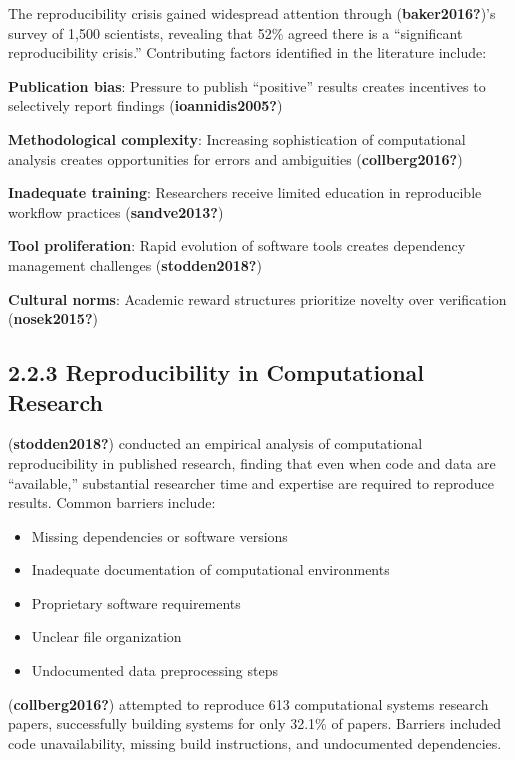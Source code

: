 \documentclass[
  oneside,
  open=any]{scrbook}
\providecommand{\tightlist}{%
  \setlength{\itemsep}{0pt}\setlength{\parskip}{0pt}}\usepackage{longtable,booktabs,array}
\begin{document}
The reproducibility crisis gained widespread attention through
(\textbf{baker2016?})'s survey of 1,500 scientists, revealing that 52\%
agreed there is a ``significant reproducibility crisis.'' Contributing
factors identified in the literature include:

\textbf{Publication bias}: Pressure to publish ``positive'' results
creates incentives to selectively report findings
(\textbf{ioannidis2005?})

\textbf{Methodological complexity}: Increasing sophistication of
computational analysis creates opportunities for errors and ambiguities
(\textbf{collberg2016?})

\textbf{Inadequate training}: Researchers receive limited education in
reproducible workflow practices (\textbf{sandve2013?})

\textbf{Tool proliferation}: Rapid evolution of software tools creates
dependency management challenges (\textbf{stodden2018?})

\textbf{Cultural norms}: Academic reward structures prioritize novelty
over verification (\textbf{nosek2015?})

\subsection{2.2.3 Reproducibility in Computational
Research}\label{reproducibility-in-computational-research}

(\textbf{stodden2018?}) conducted an empirical analysis of computational
reproducibility in published research, finding that even when code and
data are ``available,'' substantial researcher time and expertise are
required to reproduce results. Common barriers include:

\begin{itemize}
\tightlist
\item
  Missing dependencies or software versions
\item
  Inadequate documentation of computational environments
\item
  Proprietary software requirements
\item
  Unclear file organization
\item
  Undocumented data preprocessing steps
\end{itemize}

(\textbf{collberg2016?}) attempted to reproduce 613 computational
systems research papers, successfully building systems for only 32.1\%
of papers. Barriers included code unavailability, missing build
instructions, and undocumented dependencies.
\end{document}
